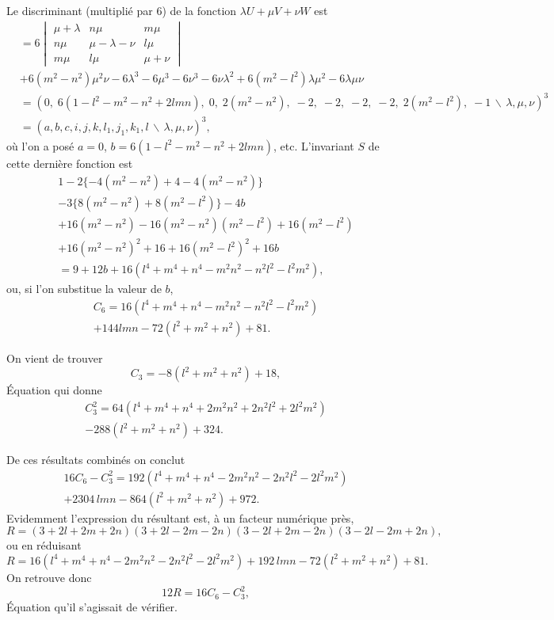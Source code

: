 \documentclass[11pt,a4paper]{article}
\theoremstyle{definition}
\begin{document}
Le discriminant (multipli\'{e} par $6$) de la fonction $\lambda U + \mu V + \nu W$ est
\begin{align*}
&= 6\begin{vmatrix}\mu+\lambda & n\mu & m\mu \\ n\mu & \mu-\lambda-\nu & l\mu \\ m\mu & l\mu & \mu+\nu\end{vmatrix} \\
&+ 6(m^{2}-n^{2})\mu^{2}\nu - 6\lambda^{3} - 6\mu^{3} - 6\nu^{3} - 6\nu\lambda^{2}
+ 6(m^{2}-l^{2})\lambda\mu^{2} - 6\lambda\mu\nu \\
&= (0,\; 6(1-l^{2}-m^{2}-n^{2}+2lmn),\; 0,\; 2(m^{2}-n^{2}),\; -2,\; -2,\; -2,\; -2,\; 2(m^{2}-l^{2}),\; -1\,\backslash\!\!\,\lambda,\mu,\nu)^{3} \\
&= (a,b,c,i,j,k,l_{1},j_{1},k_{1},l\,\backslash\!\!\,\lambda,\mu,\nu)^{3},
\end{align*}
o\`{u} l'on a pos\'{e} $a=0$, $b = 6(1-l^{2}-m^{2}-n^{2}+2lmn)$, etc.
L'invariant $S$ de cette derni\`{e}re fonction est
\begin{multline*}
1 - 2\{-4(m^{2}-n^{2})+4-4(m^{2}-n^{2})\} \\
- 3\{8(m^{2}-n^{2})+8(m^{2}-l^{2})\} - 4b \\
+ 16(m^{2}-n^{2}) - 16(m^{2}-n^{2})(m^{2}-l^{2}) + 16(m^{2}-l^{2}) \\
+ 16(m^{2}-n^{2})^{2} + 16 + 16(m^{2}-l^{2})^{2} + 16b \\
= 9 + 12b + 16(l^{4}+m^{4}+n^{4}-m^{2}n^{2}-n^{2}l^{2}-l^{2}m^{2}),
\end{multline*}
ou, si l'on substitue la valeur de $b$,
\begin{multline*}
C_{6} = 16(l^{4}+m^{4}+n^{4}-m^{2}n^{2}-n^{2}l^{2}-l^{2}m^{2}) \\
+ 144lmn - 72(l^{2}+m^{2}+n^{2}) + 81.
\end{multline*}

On vient de trouver
\[C_{3} = -8(l^{2}+m^{2}+n^{2})+18,\]
\'{E}quation qui donne
\begin{multline*}
C_{3}^{2} = 64(l^{4}+m^{4}+n^{4}+2m^{2}n^{2}+2n^{2}l^{2}+2l^{2}m^{2}) \\
- 288(l^{2}+m^{2}+n^{2}) + 324.
\end{multline*}

\newpage

De ces r\'{e}sultats combin\'{e}s on conclut
\begin{multline*}
16C_{6} - C_{3}^{2} = 192(l^{4}+m^{4}+n^{4}-2m^{2}n^{2}-2n^{2}l^{2}-2l^{2}m^{2}) \\
+ 2304\,lmn - 864(l^{2}+m^{2}+n^{2}) + 972.
\end{multline*}
Evidemment l'expression du r\'{e}sultant est, \`{a} un facteur num\'{e}rique pr\`{e}s,
\[R = (3+2l+2m+2n)(3+2l-2m-2n)(3-2l+2m-2n)(3-2l-2m+2n),\]
ou en r\'{e}duisant
\[R = 16(l^{4}+m^{4}+n^{4}-2m^{2}n^{2}-2n^{2}l^{2}-2l^{2}m^{2}) + 192\,lmn - 72(l^{2}+m^{2}+n^{2}) + 81.\]
On retrouve donc
\[12R = 16C_{6} - C_{3}^{2},\]
\'{E}quation qu'il s'agissait de v\'{e}rifier.
\end{document}
